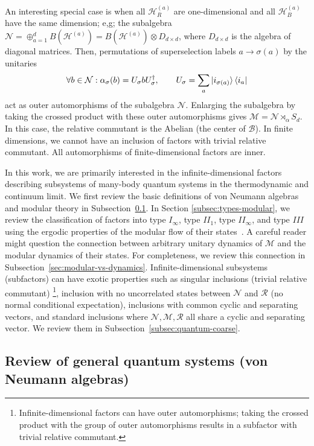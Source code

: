 \documentclass[a4paper,11pt]{article}
\theoremstyle{definition}
\newcommand{\mB}{\mathcal{B}}%
\newcommand{\mR}{\mathcal{R}}
\newcommand{\mN}{\mathcal{N}}
\newcommand{\mH}{\mathcal{H}}
\newcommand{\mM}{\mathcal{M}}
\begin{document}
An interesting special case is when all $\mH_R^{(a)}$ are one-dimensional and all $\mH_B^{(a)}$ have the same dimension; e,g; the subalgebra $\mN=\oplus_{a=1}^d B(\mH^{(a)})=B(\mH^{(a)})\otimes D_{d\times d}$, where $D_{d\times d}$ is the algebra of diagonal matrices. Then, permutations of superselection labels $a\to \sigma(a)$ by the unitaries
 \begin{align}
    \forall b\in\mN: \alpha_\sigma(b)=U_\sigma b U_\sigma^\dagger,\qquad U_{\sigma}=\sum_a \ket{i_{\sigma(a)}}\bra{i_a}
 \end{align}
act as outer automorphisms of the subalgebra $\mN$.
Enlarging the subalgebra by taking the crossed product with these outer automorphisms gives $\mM=\mN\rtimes_\alpha S_d$. In this case, the relative commutant is the Abelian (the center of $\mB$). In finite dimensions, we cannot have an inclusion of factors with trivial relative commutant. All automorphisms of finite-dimensional factors are inner.


In this work, we are primarily interested in the infinite-dimensional factors describing subsystems of many-body quantum systems in the thermodynamic and continuum limit. We first review the basic definitions of von Neumann algebras and modular theory in Subsection~\ref{app:vN}. In Section \ref{subsec:types-modular}, we review the classification of factors into type $I_\infty$, type $II_1$, type $II_\infty$, and type $III$ using the ergodic properties of the modular flow of their states~\cite{Takesaki1970,Connes1973}. A careful reader might question the connection between arbitrary unitary dynamics of $\mM$ and the modular dynamics of their states. For completeness, we review this connection in  Subsection~\ref{sec:modular-vs-dynamics}. Infinite-dimensional subsystems (subfactors) can have exotic properties such as singular inclusions (trivial relative commutant) \footnote{Infinite-dimensional factors can have outer automorphisms; taking the crossed product with the group of outer automorphisms results in a subfactor with trivial relative commutant.}, inclusion with no uncorrelated states between $\mN$ and $\mR$ (no normal conditional expectation), inclusions with common cyclic and separating vectors, and standard inclusions where $\mN,\mM,\mR$ all share a cyclic and separating vector. We review them in Subsection~\ref{subsec:quantum-coarse}.

\subsection{Review of general quantum systems (von Neumann algebras)}\label{app:vN}
\end{document}
